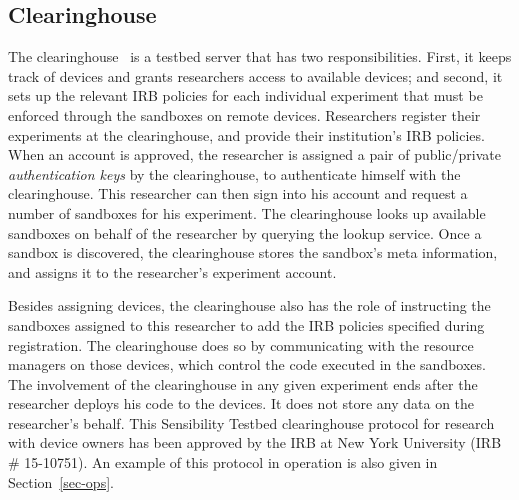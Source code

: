 \subsection{Clearinghouse}\label{sec-ch}
The clearinghouse~\cite{ch} is a testbed server that has two 
responsibilities. First, it keeps track of devices and grants 
researchers access to available devices; and second, it
sets up the relevant IRB policies for each individual experiment that 
must be enforced through the sandboxes on remote devices.
Researchers register their experiments at the clearinghouse, and 
provide their institution's IRB 
policies. When an account is approved, the researcher is assigned 
a pair of public/private \textit{authentication keys} by the 
clearinghouse, to authenticate himself with the clearinghouse. This
researcher can then sign into his account and request a 
number of sandboxes for his experiment. The clearinghouse 
looks up available sandboxes on behalf of the researcher by 
querying the lookup service. Once a sandbox is discovered, the 
clearinghouse stores the sandbox's meta information, 
and assigns it to the researcher's experiment account. 

Besides assigning devices, the clearinghouse also has the role of 
instructing the sandboxes assigned to this researcher to add the IRB 
policies specified during registration. The clearinghouse does so 
by communicating with the resource managers on those devices, which 
control the code executed in the sandboxes. The involvement of the 
clearinghouse in any given experiment ends 
after the researcher deploys his code to the devices. It does not store any
data on the researcher's behalf. 
This Sensibility Testbed clearinghouse 
protocol for research with device owners has been approved by
the IRB at New York University (IRB \# 15-10751). An example 
of this protocol in operation is also given in Section~\ref{sec-ops}.


